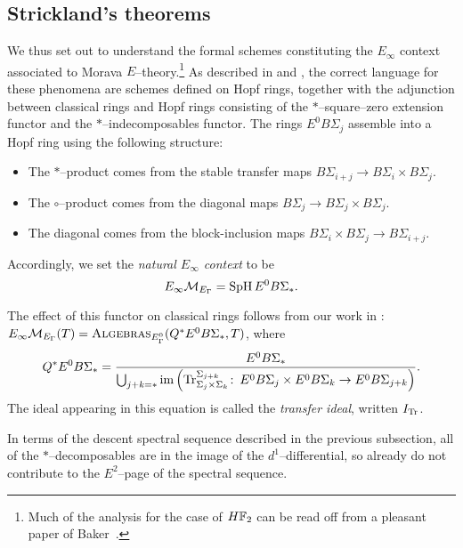 \subsection*{Strickland's theorems}

We thus set out to understand the formal schemes constituting the \(E_\infty\) context associated to Morava \(E\)--theory.\footnote{Much of the analysis for the case of \(\HFtwo\) can be read off from a pleasant paper of Baker~\cite{Baker}.}  As described in  and , the correct language for these phenomena are schemes defined on Hopf rings, together with the adjunction between classical rings and Hopf rings consisting of the \(\ast\)--square--zero extension functor and the \(\ast\)--indecomposables functor.  The rings \(E^0 B\Sigma_j\) assemble into a Hopf ring using the following structure:
\begin{itemize}
    \item The \(\ast\)--product comes from the stable transfer maps \(B\Sigma_{i+j} \to B\Sigma_i \times B\Sigma_j\).
    \item The \(\circ\)--product comes from the diagonal maps \(B\Sigma_j \to B\Sigma_j \times B\Sigma_j\).
    \item The diagonal comes from the block-inclusion maps \(B\Sigma_i \times B\Sigma_j \to B\Sigma_{i+j}\).
\end{itemize}

\begin{definition}
Accordingly, we set the \textit{natural \(E_\infty\) context} to be \[E_\infty\mathcal{M}_{E_\Gamma} = \operatorname{SpH} E^0 B\Sigma_*.\]
\end{definition}

The effect of this functor on classical rings follows from our work in : \(E_\infty\mathcal{M}_{E_\Gamma}(T) = \normalfont\textsc{Algebras}_{E_\Gamma^0}(Q^* E^0 B\Sigma_*, T)\), where \[Q^* E^0 B\Sigma_* = \frac{E^0 B\Sigma_*}{\bigcup_{j+k=*}\operatorname{im}\left(\mathrm{Tr}_{\Sigma_j \times \Sigma_k}^{\Sigma_{j + k}}\colon\thinspace E^0 B\Sigma_j \times E^0 B\Sigma_k \to E^0 B\Sigma_{j+k}\right)}.\]  The ideal appearing in this equation is called the \textit{transfer ideal}, written \(I_{\mathrm{Tr}}\).

\begin{remark}
In terms of the descent spectral sequence described in the previous subsection, all of the \(*\)--decomposables are in the image of the \(d^1\)--differential, so already do not contribute to the \(E^2\)--page of the spectral sequence.
\end{remark}

